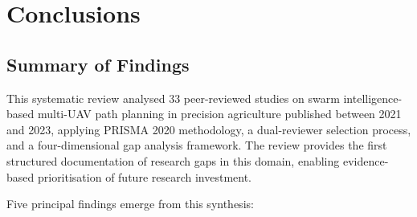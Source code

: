 \documentclass[review,3p,times]{elsarticle}
\begin{document}
\section{Conclusions}

\subsection{Summary of Findings}

This systematic review analysed 33 peer-reviewed studies on swarm intelligence-based multi-UAV path planning in precision agriculture published between 2021 and 2023, applying PRISMA 2020 methodology, a dual-reviewer selection process, and a four-dimensional gap analysis framework. The review provides the first structured documentation of research gaps in this domain, enabling evidence-based prioritisation of future research investment.

Five principal findings emerge from this synthesis:
\end{document}
